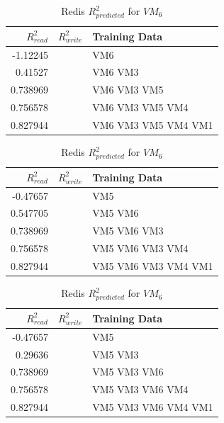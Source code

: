 \documentclass{acm_proc_article-sp}
\begin{document}
\begin{table}
\centering
\caption{Redis $R_{predicted}^2$ for $VM_6$}
\begin{tabular}{|r|r|l|} \hline
$R_{read}^2$&$R_{write}^2$&Training Data\\ \hline
-1.12245 &   & VM6 \\ \hline 
0.41527 &   & VM6 VM3 \\ \hline 
0.738969 &   & VM6 VM3 VM5 \\ \hline 
0.756578 &   & VM6 VM3 VM5 VM4 \\ \hline 
0.827944 &   & VM6 VM3 VM5 VM4 VM1 \\ \hline 
\hline\end{tabular}
\label{table:redis}
\end{table}

\begin{table}
\centering
\caption{Redis $R_{predicted}^2$ for $VM_6$}
\begin{tabular}{|r|r|l|} \hline
$R_{read}^2$&$R_{write}^2$&Training Data\\ \hline
-0.47657 &   & VM5 \\ \hline 
0.547705 &   & VM5 VM6 \\ \hline 
0.738969 &   & VM5 VM6 VM3 \\ \hline 
0.756578 &   & VM5 VM6 VM3 VM4 \\ \hline 
0.827944 &   & VM5 VM6 VM3 VM4 VM1 \\ \hline 
\hline\end{tabular}
\label{table:redis}
\end{table}

\begin{table}
\centering
\caption{Redis $R_{predicted}^2$ for $VM_6$}
\begin{tabular}{|r|r|l|} \hline
$R_{read}^2$&$R_{write}^2$&Training Data\\ \hline
-0.47657 &   & VM5 \\ \hline 
0.29636 &   & VM5 VM3 \\ \hline 
0.738969 &   & VM5 VM3 VM6 \\ \hline 
0.756578 &   & VM5 VM3 VM6 VM4 \\ \hline 
0.827944 &   & VM5 VM3 VM6 VM4 VM1 \\ \hline 
\hline\end{tabular}
\label{table:redis}
\end{table}
\end{document}

